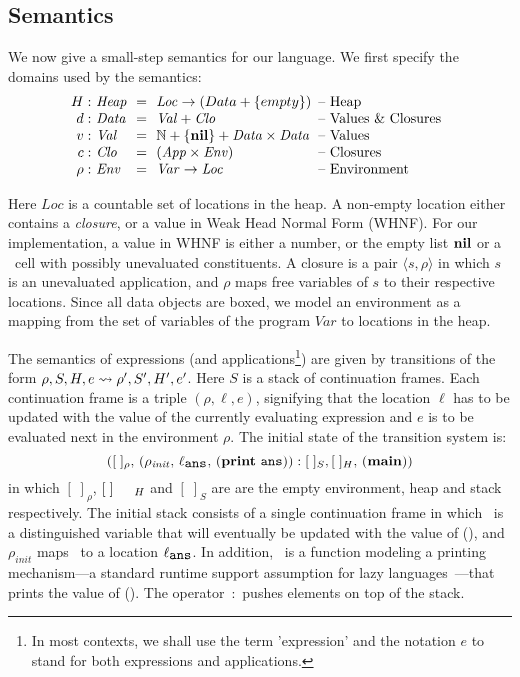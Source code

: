 \documentclass[9pt,nonatbib]{sigplanconf}
\newcommand{\stk}{{S}}
\begin{document}
\subsection{Semantics}\label{sec:semantics}
We now give  a small-step semantics for our  language.
We first specify the domains used by the semantics:
\[
\renewcommand{\arraystretch}{1}
\begin{array}{@{}r@{\ }l@{\ \ }c@{\ \ }l@{\hspace{0.5em}}l}
\heap: & \mathit{Heap} & =&\mathit{Loc} \rightarrow (Data + \{empty\}) & \mbox{-- Heap}\\
d: & \mathit{Data} &=&\mathit{Val} + \mathit{Clo} & \mbox{-- Values \& Closures} \\
v:   & \mathit{Val} &=& \mathbb{N} + \{\NIL\} + \mathit{Data \times Data}& \mbox{-- Values}\\
c:   & \mathit{Clo} &=& \mathit{(App \times Env)}& \mbox{-- Closures}\\
\rho: & \mathit{Env} &=&\mathit{Var} \rightarrow \mathit{Loc} &
\mbox{-- Environment} \\
\end{array}
\]


Here $\mathit{Loc}$  is a countable set  of locations in the  heap.  A
non-empty location either contains a {\em closure}, or a value in Weak
Head Normal Form (WHNF)\cite{Jones87}. For our implementation, a value
in WHNF is either a number, or  the empty list $\mbox{$\mathbf{ nil}$}$ or a \CONS\ cell
with possibly unevaluated constituents.  A  closure is a pair $\langle
s, \rho\rangle$ in which $s$ is an unevaluated application, and $\rho$
maps free variables  of $s$ to their respective  locations.  Since all
data objects are boxed, we model  an environment as a mapping from the
set of  variables of  the program $\mathit{Var}$  to locations  in the
heap.


The  semantics  of   expressions  (and  applications\footnote{In  most
 contexts, we  shall use the  term 'expression' and the  notation $e$
to stand   for both expressions and applications.}) 
are given by transitions of the form $\rho, \stk, \heap, e \rightsquigarrow
\rho',  \stk', \heap',  e'$.  Here  $\stk$ is  a stack  of continuation
frames.  Each  continuation frame  is a triple $(\rho,  \ell, e)$,
signifying that the  location $\ell$ has to be updated  with the value
of the  currently evaluating  expression and $e$  is to  be evaluated
next  in the  environment $\rho$.  
The  initial  state  of  the  transition  system  is:
\[([\;]_\rho,\,     (\rho_\mathit{init},     \,    \ell_{\mathbf{\mbox{\tt ans}}}     ,\,
(\mathbf{print}~\mathbf{\mbox{\tt ans}})):[\;]_{S},   [\;]_{H},\,   (\mathbf{main}))\]  in   which
$[\;]_\rho$, $[\;]_{\mbox  \footnotesize {H}}$ and $[\;]_{S}$  are are
the empty environment, heap and  stack respectively. The initial stack
consists  of  a  single  continuation   frame  in  which  \ans\  is  a
distinguished variable that will eventually  be updated with the value
of  (\mainpgm),  and  $\rho_\mathit{init}$  maps \ans\  to  a  location
$\ell_{\mathbf{\mbox{\tt ans}}}$.  In addition, \print\ is a function modeling a printing
mechanism---a   standard   runtime   support  assumption   for   lazy
languages~\cite{Jones87}---that prints  the value of  (\mainpgm).  The
operator~$:$ pushes elements on top of the stack.
\end{document}
